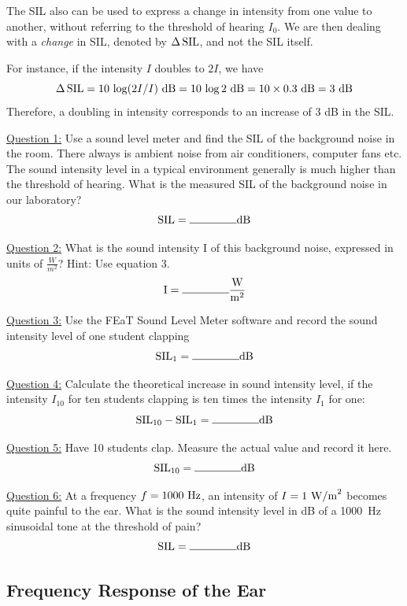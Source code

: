 \documentclass[11pt]{NSF}
\def\be{\begin{equation}}
\def\ee{\end{equation}}
\begin{document}
The SIL also can be used to express a change in intensity from one 
value to another, without referring to the threshold of hearing $I_0$. 
We are then dealing with a {\em change} in SIL, denoted by 
$\Delta\,{\rm SIL}$, and not the SIL itself. 

For instance, if the intensity $I$ doubles to $2I$, we have
%
\be
\Delta\,{\rm SIL} = 10\,\log (2I/I)~{\rm dB}
= 10\,\log 2~{\rm dB} 
= 10\times 0.3~{\rm dB} 
= 3~{\rm dB}
\ee
Therefore, a doubling in intensity corresponds to an increase of 3 dB in the SIL.


\underline{Question 1:} Use a sound level meter and find the SIL of the background noise in the room. There always is
ambient noise from air conditioners, computer fans etc. The sound intensity level in a typical
environment generally is much higher than the threshold of hearing. What is the measured SIL of
the background noise in our laboratory? 
\[ {\rm SIL}=\rule{1.5cm}{0.15mm}{\rm dB}\]

\underline{Question 2:} What is the sound intensity I of this background noise, expressed in units of $\frac{W}{m^2}$? Hint: Use equation 3.
\[{\rm I}=\rule{1.5cm}{0.15mm}\frac{{\rm W}}{{\rm m}^2}\]

\underline{Question 3:} Use the FEaT Sound Level Meter software and record the sound intensity level of one student
clapping
\[ {\rm SIL}_1=\rule{1.5cm}{0.15mm}{\rm dB}\]

\underline{Question 4:} Calculate the theoretical increase in sound intensity level, if the intensity $I_10$ for ten students
clapping is ten times the intensity $I_1$ for one:
\[ {\rm SIL}_{10} - {\rm SIL}_1=\rule{1.5cm}{0.15mm}{\rm dB}\]

\underline{Question 5:} Have 10 students clap. Measure the actual value and record it here.
\[ {\rm SIL}_{10}=\rule{1.5cm}{0.15mm}{\rm dB}\]

\underline{Question 6:} At a frequency $f =1000~{\rm Hz}$, an intensity of $I = 1~{\rm W/m}^2$ 
becomes quite painful to the ear.
What is the sound intensity level in dB of a 1000~Hz sinusoidal 
tone at the threshold of pain?
\[ {\rm SIL}=\rule{1.5cm}{0.15mm}{\rm dB}\]

\subsection{Frequency Response of the Ear}
\end{document}
